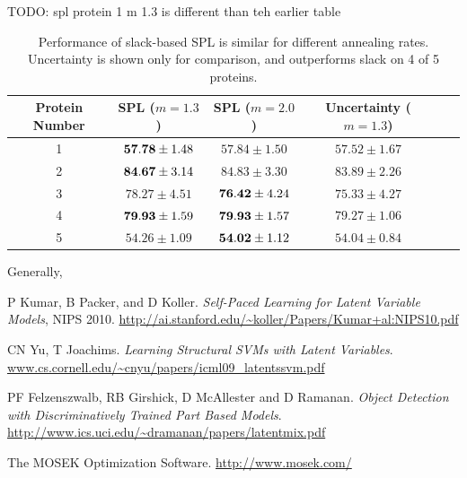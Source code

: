 \documentclass{article}
\begin{document}
TODO: spl protein 1 m 1.3 is different than teh earlier table
\begin{table}
\caption{Performance of slack-based SPL is similar for different annealing rates.  Uncertainty is shown only for comparison, and outperforms slack on 4 of 5 proteins.}
\begin{center}
\begin{tabular}{|c|c|c|c|c|c|}
\hline Protein Number  & SPL ($m=1.3$) & SPL ($m=2.0$) & Uncertainty ($m=1.3$) \\\hline
1 & ${\bf57.78} \pm 1.48$ & $57.84 \pm 1.50$ & $57.52 \pm 1.67$ \\ \hline
2 & ${\bf84.67} \pm 3.14$ & $84.83 \pm 3.30$ & $83.89 \pm 2.26$ \\ \hline
3 & $78.27 \pm 4.51$ & ${\bf76.42} \pm 4.24$ & $75.33 \pm 4.27$ \\ \hline
4 & ${\bf79.93} \pm 1.59$ & ${\bf79.93} \pm 1.57$ & $79.27 \pm 1.06$ \\ \hline
5 & $54.26 \pm 1.09$ & ${\bf54.02} \pm 1.12$ & $54.04 \pm 0.84$ \\ \hline
\end{tabular}
\end{center}
\label{tbl:faster}
\end{table}

Generally, 
\begin{thebibliography}{9}


 P Kumar, B Packer, and D Koller. \emph{Self-Paced Learning for Latent Variable Models},
NIPS 2010. \url{http://ai.stanford.edu/~koller/Papers/Kumar+al:NIPS10.pdf}

 CN Yu, T Joachims. \emph{Learning Structural SVMs with Latent Variables}. \url{www.cs.cornell.edu/~cnyu/papers/icml09_latentssvm.pdf}

 PF Felzenszwalb, RB Girshick, D McAllester and D Ramanan. \emph{Object Detection with Discriminatively Trained
Part Based Models}.  \url{http://www.ics.uci.edu/~dramanan/papers/latentmix.pdf}

 The MOSEK Optimization Software. \url{http://www.mosek.com/}

\end{thebibliography}
\end{document}
